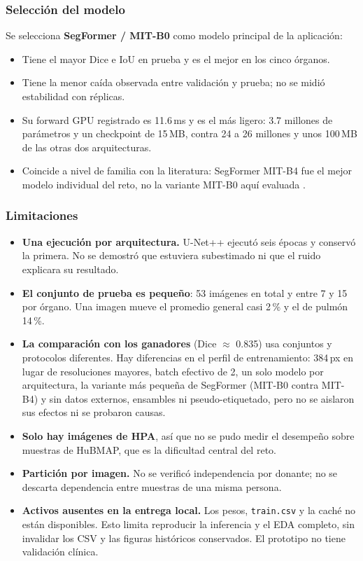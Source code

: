 \documentclass[11pt,letterpaper]{article}
\begin{document}
\subsubsection{Selección del modelo}

Se selecciona \textbf{SegFormer / MIT-B0} como modelo principal de la aplicación:

\begin{itemize}
  \item Tiene el mayor Dice e IoU en prueba y es el mejor en los cinco órganos.
  \item Tiene la menor caída observada entre validación y prueba; no se midió estabilidad con réplicas.
  \item Su forward GPU registrado es 11.6\,ms y es el más ligero: 3.7 millones de parámetros y un
        checkpoint de 15\,MB, contra 24 a 26 millones y unos 100\,MB de las otras dos arquitecturas.
  \item Coincide a nivel de familia con la literatura: SegFormer MIT-B4 fue el mejor modelo individual del reto,
        no la variante MIT-B0 aquí evaluada
        \parencite{jain2023hacking}.
\end{itemize}

\subsubsection{Limitaciones}

\begin{itemize}
  \item \textbf{Una ejecución por arquitectura.} U-Net++ ejecutó seis épocas y conservó la primera.
        No se demostró que estuviera subestimado ni que el ruido explicara su resultado.
  \item \textbf{El conjunto de prueba es pequeño}: 53 imágenes en total y entre 7 y 15 por órgano.
        Una imagen mueve el promedio general casi 2\,\% y el de pulmón 14\,\%.
  \item \textbf{La comparación con los ganadores} (Dice $\approx$ 0.835) usa conjuntos y protocolos
        diferentes. Hay diferencias en el perfil de
        entrenamiento: 384\,px en lugar de resoluciones mayores, batch efectivo de 2, un solo modelo
        por arquitectura, la variante más pequeña de SegFormer (MIT-B0 contra MIT-B4) y sin datos
        externos, ensambles ni pseudo-etiquetado, pero no se aislaron sus efectos ni se probaron causas.
  \item \textbf{Solo hay imágenes de HPA}, así que no se pudo medir el desempeño sobre muestras de
        HuBMAP, que es la dificultad central del reto.
  \item \textbf{Partición por imagen.} No se verificó independencia por donante; no se descarta
        dependencia entre muestras de una misma persona.
  \item \textbf{Activos ausentes en la entrega local.} Los pesos, \texttt{train.csv} y la caché no
        están disponibles. Esto limita reproducir la inferencia y el EDA completo, sin invalidar
        los CSV y las figuras históricos conservados. El prototipo no tiene validación clínica.
\end{itemize}
\end{document}
